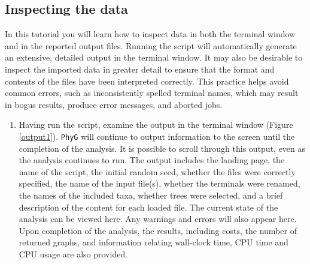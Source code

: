 \documentclass[11pt]{article}
\newcommand{\phyg}{\texttt{PhyG} }
\begin{document}
\subsection{Inspecting the data}
\label{subsec:inspecting}

In this tutorial you will learn how to inspect data in both the terminal window and 
in the reported output files. Running the script will automatically generate an extensive, 
detailed output in the terminal window. It may also be desirable to inspect the 
imported data in greater detail to ensure that the format and contents of the files 
have been interpreted correctly. This practice helps avoid common errors, such 
as inconsistently spelled terminal names, which may result in bogus results, 
produce error messages, and aborted jobs.

\begin{enumerate}

\item Having run the script, examine the output in the terminal window 
(Figure \ref{output1}). \phyg will continue to output information to the screen 
until the completion of the analysis. It is possible to scroll through this output, 
even as the analysis continues to run. The output includes the landing page, 
the name of the script, the initial random seed, whether the files were correctly 
specified, the name of the input file(s), whether the terminals were renamed, 
the names of the included taxa, whether trees were selected, and a brief 
description of the content for each loaded file. The current state of the analysis 
can be viewed here. Any warnings and errors will also appear here. Upon 
completion of the analysis, the results, including costs, the number of returned 
graphs, and information relating wall-clock time, CPU time and CPU usage are 
also provided.


\end{enumerate}
\end{document}
